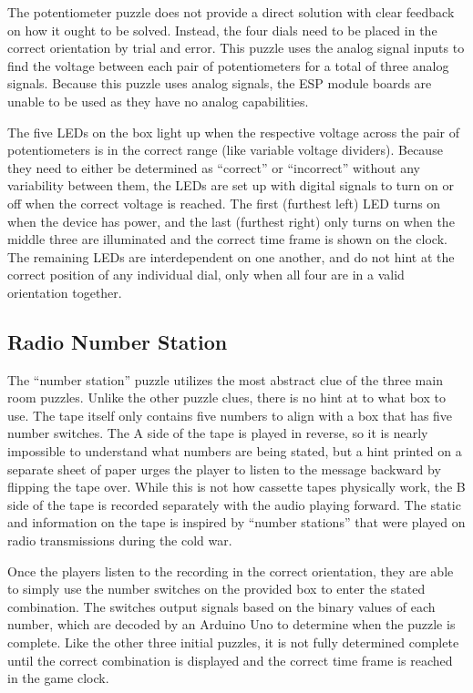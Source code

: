 \documentclass[conference]{IEEEtran}
\begin{document}
The potentiometer puzzle does not provide a direct solution with clear feedback on how it ought to be solved. Instead, 
the four dials need to be placed in the correct orientation by trial and error. This puzzle uses the analog signal inputs 
to find the voltage between each pair of potentiometers for a total of three analog signals. Because this puzzle uses analog 
signals, the ESP module boards are unable to be used as they have no analog capabilities.

\indent The five LEDs on the box light up when the respective voltage across the pair of potentiometers is in the 
correct range (like variable voltage dividers). Because they need to either be determined as ``correct'' or ``incorrect'' 
without any variability between them, the LEDs are set up with digital signals to turn on or off when the correct voltage is 
reached. The first (furthest left) LED turns on when the device has power, and the last (furthest right) only turns on when 
the middle three are illuminated and the correct time frame is shown on the clock. The remaining LEDs are interdependent on one 
another, and do not hint at the correct position of any individual dial, only when all four are in a valid orientation together.


\subsection{Radio Number Station}
The ``number station'' puzzle utilizes the most abstract clue of the three main room puzzles. Unlike the other puzzle clues, 
there is no hint at to what box to use. The tape itself only contains five numbers to align with a box that has five number 
switches. The A side of the tape is played in reverse, so it is nearly impossible to understand what numbers are being stated, 
but a hint printed on a separate sheet of paper urges the player to listen to the message backward by flipping the tape over. 
While this is not how cassette tapes physically work, the B side of the tape is recorded separately with the audio playing 
forward. The static and information on the tape is inspired by “number stations” that were played on radio transmissions during 
the cold war. 

\indent Once the players listen to the recording in the correct orientation, they are able to simply use the number 
switches on the provided box to enter the stated combination. The switches output signals based on the binary values 
of each number, which are decoded by an Arduino Uno to determine when the puzzle is complete. Like the other three initial 
puzzles, it is not fully determined complete until the correct combination is displayed and the correct time frame is reached 
in the game clock.
\end{document}
